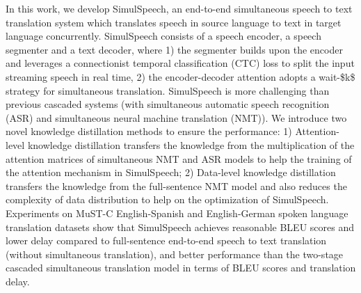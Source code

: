 In this work, we develop SimulSpeech, an end-to-end simultaneous speech to text translation system which translates speech in source language to text in target language concurrently. SimulSpeech consists of a speech encoder, a speech segmenter and a text decoder, where 1) the segmenter builds upon the encoder and leverages a connectionist temporal classification (CTC) loss to split the input streaming speech in real time, 2) the encoder-decoder attention adopts a wait-\$k\$ strategy for simultaneous translation. SimulSpeech is more challenging than previous cascaded systems (with simultaneous automatic speech recognition (ASR) and simultaneous neural machine translation (NMT)). We introduce two novel knowledge distillation methods to ensure the performance: 1) Attention-level knowledge distillation transfers the knowledge from the multiplication of the attention matrices of simultaneous NMT and ASR models to help the training of the attention mechanism in SimulSpeech; 2) Data-level knowledge distillation transfers the knowledge from the full-sentence NMT model and also reduces the complexity of data distribution to help on the optimization of SimulSpeech. Experiments on MuST-C English-Spanish and English-German spoken language translation datasets show that SimulSpeech achieves reasonable BLEU scores and lower delay compared to full-sentence end-to-end speech to text translation (without simultaneous translation), and better performance than the two-stage cascaded simultaneous translation model in terms of BLEU scores and translation delay.
